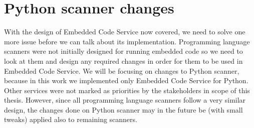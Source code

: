 \section{Python scanner changes}

With the design of Embedded Code Service now covered, we need to solve one more issue before we can talk about its implementation. Programming language scanners were not initially designed for running embedded code so we need to look at them and design any required changes in order for them to be used in Embedded Code Service. We will be focusing on changes to Python scanner, because in this work we implemented only Embedded Code Service for Python. Other services were not marked as priorities by the stakeholders in scope of this thesis. However, since all programming language scanners follow a very similar design, the changes done on Python scanner may in the future be (with small tweaks) applied also to remaining scanners.


